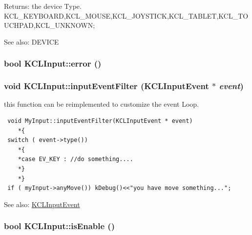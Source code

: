 \begin{Desc}
\item[Returns:]the device Type. KCL\_\-KEYBOARD,KCL\_\-MOUSE,KCL\_\-JOYSTICK,KCL\_\-TABLET,KCL\_\-TOUCHPAD,KCL\_\-UNKNOWN; \end{Desc}
\begin{Desc}
\item[See also:]DEVICE \end{Desc}
\hypertarget{class_k_c_l_input_0c3b7dd3cce5d5567c4894500074fee3}{
\subsubsection[{error}]{\setlength{\rightskip}{0pt plus 5cm}bool KCLInput::error ()}}
\label{class_k_c_l_input_0c3b7dd3cce5d5567c4894500074fee3}


\hypertarget{class_k_c_l_input_ee93fa33ec6a14baf2acf3daf23607c0}{
\subsubsection[{inputEventFilter}]{\setlength{\rightskip}{0pt plus 5cm}void KCLInput::inputEventFilter ({\bf KCLInputEvent} $\ast$ {\em event})}}
\label{class_k_c_l_input_ee93fa33ec6a14baf2acf3daf23607c0}


this function can be reimplemented to customize the event Loop. 

\begin{Code}\begin{verbatim} void MyInput::inputEventFilter(KCLInputEvent * event)
    *{
 switch ( event->type())
    *{
    *case EV_KEY : //do something....
    *}
    *}
 if ( myInput->anyMove()) kDebug()<<"you have move something...";
\end{verbatim}
\end{Code}

 \begin{Desc}
\item[See also:]\hyperlink{class_k_c_l_input_event}{KCLInputEvent} \end{Desc}
\hypertarget{class_k_c_l_input_fcc85277197831a8dae75178b90bfebb}{
\subsubsection[{isEnable}]{\setlength{\rightskip}{0pt plus 5cm}bool KCLInput::isEnable ()}}
\label{class_k_c_l_input_fcc85277197831a8dae75178b90bfebb}


